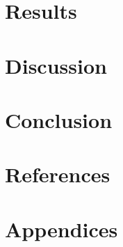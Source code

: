 \documentclass[12pt]{article}
\begin{document}
\section{Results}

\section{Discussion}

\section{Conclusion}

\section{References}




\section{Appendices}
\end{document}
